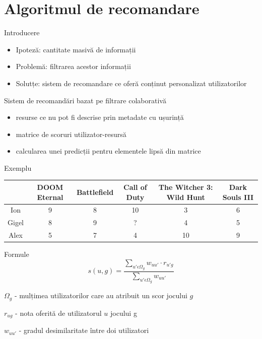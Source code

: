 \documentclass{beamer}
\begin{document}
\section{Algoritmul de recomandare}
\frame{\tableofcontents[currentsection]}
\begin{frame}{Introducere}
 
    \begin{itemize}
        \item Ipoteză: cantitate masivă de informații
        \item Problemă: filtrarea acestor informații
        \item Solutțe: sistem de recomandare ce oferă conținut personalizat utilizatorilor
    \end{itemize}
\end{frame}

\begin{frame}{Sistem de recomandări bazat pe filtrare colaborativă}
    \begin{itemize}
        \item resurse ce nu pot fi descrise prin metadate cu ușurință
        \item matrice de scoruri utilizator-resursă
        \item calcularea unei predicții pentru elementele lipsă din matrice
    \end{itemize}
\end{frame}

\begin{frame}{Exemplu}
\begin{center}
\begin{adjustbox}{max size={\textwidth}{\textheight}}
\begin{tabular}{||c c c c c c||} 
 \hline
 & DOOM Eternal & Battlefield & Call of Duty & The Witcher 3: Wild Hunt & Dark Souls III \\ [0.5ex] 
 \hline\hline
 Ion & 9 & 8 & 10 & 3 & 6 \\ 
 \hline
 Gigel & 8 & 9 & ? & 4 & 5  \\
 \hline
 Alex & 5 & 7 & 4 & 10 & 9 \\
 \hline
\end{tabular}
\end{adjustbox}
\end{center}
    
\end{frame}

\begin{frame}{Formule}
    \[ s(u, g) = \dfrac{ \sum\limits_{u' \epsilon \Omega_{g} } w_{uu'} \cdot r_{u'g} }{\sum\limits_{u' \epsilon \Omega_{g}} w_{uu'}}  \]
    
    \( \Omega_{g}\) - mulțimea utilizatorilor care au atribuit un scor jocului \( g \)
    
    \( r_{ug} \) - nota oferită de utilizatorul \( u \) jocului g
    
    \( w_{uu'}\) - gradul desimilaritate între doi utilizatori
\end{frame}
\end{document}
